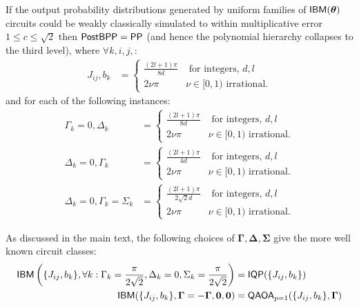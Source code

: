 \begin{theorem}\label{thm:ibmmultsimulationhardness}
    If the output probability distributions generated by uniform families of $\textsf{IBM}({\boldsymbol\theta})$ circuits could be weakly classically simulated to within multiplicative error $1 \leq c \leq \sqrt{2}$ then $\operatorname{\textsf{PostBPP}} = \operatorname{\textsf{PP}}$ (and hence the polynomial hierarchy collapses to the third level), where $\forall k, i, j,$:
    \begin{align}
        J_{ij}, b_{k} &= 
        \begin{cases}
            \frac{(2l+1)\pi}{8d} &\text{ for integers, } d, l\\
            2\nu \pi& \nu \in[0,1) \text{ irrational.}
        \end{cases}\label{hardparametervalues1}
    \end{align}
    and for each of the following instances:
    \begin{align}
        \Gamma_k = 0, \Delta_k &=  
        \begin{cases}
            \frac{(2l+1)\pi}{8d} &\text{ for integers, } d, l\\
            2\nu \pi& \nu \in[0,1) \text{ irrational.}
        \end{cases}\label{hardparametervalues2}\\
        \Delta_k = 0, \Gamma_k &= 
        \begin{cases}
            \frac{(2l+1)\pi}{4d} &\text{ for integers, } d, l\\
            2\nu \pi& \nu \in[0,1) \text{ irrational.}
        \end{cases}\label{hardparametervalues3}\\
        \Delta_k = 0, \Gamma_k = \Sigma_k &=  
        \begin{cases}
            \frac{(2l+1)\pi}{2\sqrt{2}d} &\text{ for integers, } d, l\\
            2\nu \pi& \nu \in[0,1) \text{ irrational.}
        \end{cases}\label{hardparametervalues4}
\end{align}
\end{theorem}

As discussed in the main text, the following choices of $\mathbf{\Gamma}, \mathbf{\Delta}, \mathbf{\Sigma}$ give the more well known circuit classes:
\begin{align}
    \textsf{IBM}\left(\{J_{ij}, b_{k}\}, \forall k: \Gamma_k = \frac{\pi}{2\sqrt{2}}, \Delta_k = 0, \Sigma_k =  \frac{\pi}{2\sqrt{2}}\right) &= \operatorname{\textsf{IQP}}(\{J_{ij}, b_{k}\})\\
    \textsf{IBM}(\{J_{ij}, b_{k}\}, \mathbf{\Gamma} = -\mathbf{\Gamma}, \mathbf{0} , \mathbf{0}) &= \operatorname{\textsf{QAOA}}_{p=1}(\{J_{ij}, b_{k}\}, \mathbf{\Gamma})
\end{align}


